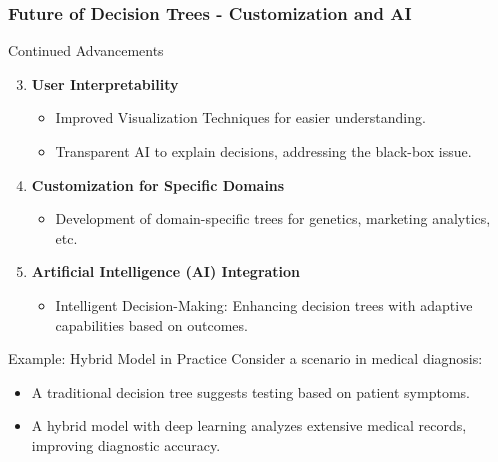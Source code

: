 \documentclass[aspectratio=169]{beamer}
\begin{document}
\begin{frame}[fragile]
    \frametitle{Future of Decision Trees - Customization and AI}
    \begin{block}{Continued Advancements}
        \begin{enumerate}
            \setcounter{enumi}{2}
            \item \textbf{User Interpretability}
            \begin{itemize}
                \item Improved Visualization Techniques for easier understanding.
                \item Transparent AI to explain decisions, addressing the black-box issue.
            \end{itemize}
            
            \item \textbf{Customization for Specific Domains}
            \begin{itemize}
                \item Development of domain-specific trees for genetics, marketing analytics, etc.
            \end{itemize}
            
            \item \textbf{Artificial Intelligence (AI) Integration}
            \begin{itemize}
                \item Intelligent Decision-Making: Enhancing decision trees with adaptive capabilities based on outcomes.
            \end{itemize}
        \end{enumerate}
    \end{block}
    
    \begin{block}{Example: Hybrid Model in Practice}
        Consider a scenario in medical diagnosis:
        \begin{itemize}
            \item A traditional decision tree suggests testing based on patient symptoms.
            \item A hybrid model with deep learning analyzes extensive medical records, improving diagnostic accuracy.
        \end{itemize}
    \end{block}
\end{frame}
\end{document}
